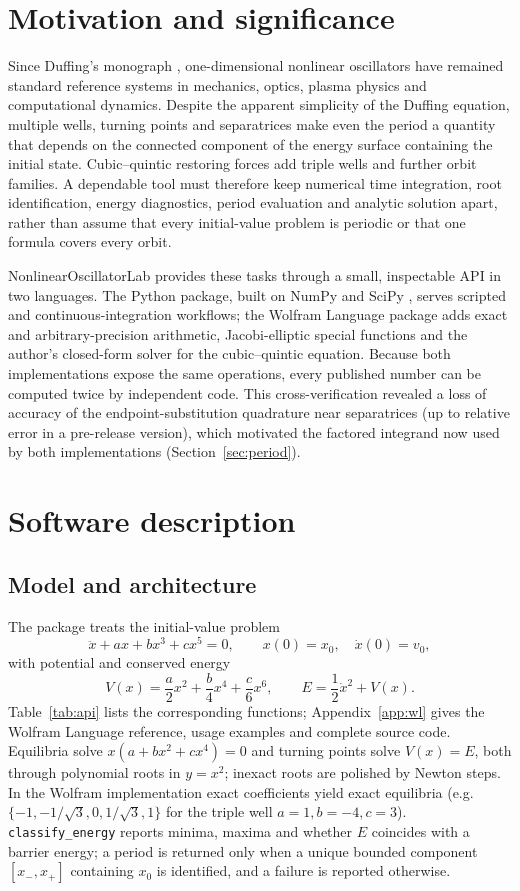 \documentclass[11pt]{article}
\begin{document}
\section{Motivation and significance}
Since Duffing's monograph \cite{duffing}, one-dimensional nonlinear oscillators have remained standard reference systems in mechanics, optics, plasma physics and computational dynamics. Despite the apparent simplicity of the Duffing equation, multiple wells, turning points and separatrices make even the period a quantity that depends on the connected component of the energy surface containing the initial state. Cubic--quintic restoring forces add triple wells and further orbit families. A dependable tool must therefore keep numerical time integration, root identification, energy diagnostics, period evaluation and analytic solution apart, rather than assume that every initial-value problem is periodic or that one formula covers every orbit.

NonlinearOscillatorLab provides these tasks through a small, inspectable API in two languages. The Python package, built on NumPy and SciPy \cite{numpy,scipy}, serves scripted and continuous-integration workflows; the Wolfram Language package adds exact and arbitrary-precision arithmetic, Jacobi-elliptic special functions and the author's closed-form solver for the cubic--quintic equation. Because both implementations expose the same operations, every published number can be computed twice by independent code. This cross-verification revealed a loss of accuracy of the endpoint-substitution quadrature near separatrices (up to \pythonLegacyMaxErr{} relative error in a pre-release version), which motivated the factored integrand now used by both implementations (Section~\ref{sec:period}).

\section{Software description}
\subsection{Model and architecture}
The package treats the initial-value problem
\begin{equation}\ddot x+a x+b x^3+c x^5=0,\qquad x(0)=x_0,\quad \dot x(0)=v_0,\end{equation}
with potential and conserved energy
\begin{equation}V(x)=\frac{a}{2}x^2+\frac{b}{4}x^4+\frac{c}{6}x^6,\qquad E=\frac12\dot x^2+V(x).\end{equation}
Table~\ref{tab:api} lists the corresponding functions; Appendix~\ref{app:wl} gives the Wolfram Language reference, usage examples and complete source code. Equilibria solve $x(a+bx^2+cx^4)=0$ and turning points solve $V(x)=E$, both through polynomial roots in $y=x^2$; inexact roots are polished by Newton steps. In the Wolfram implementation exact coefficients yield exact equilibria (e.g.\ $\{-1,-1/\sqrt3,0,1/\sqrt3,1\}$ for the triple well $a=1,b=-4,c=3$). \texttt{classify\_energy} reports minima, maxima and whether $E$ coincides with a barrier energy; a period is returned only when a unique bounded component $[x_-,x_+]$ containing $x_0$ is identified, and a failure is reported otherwise.
\end{document}
